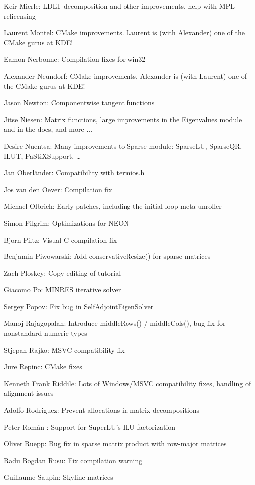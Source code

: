 Keir Mierle:  LDLT decomposition and other improvements, help with MPL relicensing  

Laurent Montel:  CMake improvements. Laurent is (with Alexander) one of the CMake gurus at KDE!  

Eamon Nerbonne:  Compilation fixes for win32  

Alexander Neundorf:  CMake improvements. Alexander is (with Laurent) one of the CMake gurus at KDE!  

Jason Newton:  Componentwise tangent functions  

Jitse Niesen:  Matrix functions, large improvements in the Eigenvalues module and in the docs, and more ...  

Desire Nuentsa:  Many improvements to Sparse module: SparseLU, SparseQR, ILUT, PaStiXSupport, …  

Jan Oberländer:  Compatibility with termios.h  

Jos van den Oever:  Compilation fix  

Michael Olbrich:  Early patches, including the initial loop meta-unroller  

Simon Pilgrim:  Optimizations for NEON  

Bjorn Piltz:  Visual C compilation fix  

Benjamin Piwowarski:  Add conservativeResize() for sparse matrices  

Zach Ploskey:  Copy-editing of tutorial  

Giacomo Po:  MINRES iterative solver  

Sergey Popov:  Fix bug in SelfAdjointEigenSolver  

Manoj Rajagopalan:  Introduce middleRows() / middleCols(), bug fix for nonstandard numeric types  

Stjepan Rajko:  MSVC compatibility fix  

Jure Repinc:  CMake fixes  

Kenneth Frank Riddile:  Lots of Windows/MSVC compatibility fixes, handling of alignment issues  

Adolfo Rodriguez:  Prevent allocations in matrix decompositions  

Peter Román : Support for SuperLU's ILU factorization  

Oliver Ruepp:  Bug fix in sparse matrix product with row-major matrices  

Radu Bogdan Rusu:  Fix compilation warning  

Guillaume Saupin:  Skyline matrices  

